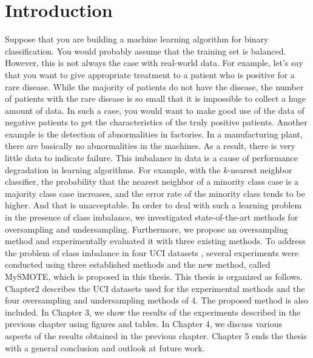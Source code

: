 \chapter{Introduction}

Suppose that you are building a machine learning algorithm for binary classification.
You would probably assume that the training set is balanced. However, this is not always the case with real-world data. For example, let's say that you want to give appropriate treatment to a patient who is positive for a rare disease. While the majority of patients do not have the disease, the number of patients with the rare disease is so small that it is impossible to collect a huge amount of data. In such a case, you would want to make good use of the data of negative patients to get the characteristics of the truly positive patients. 
Another example is the detection of abnormalities in factories. In a manufacturing plant, there are basically no abnormalities in the machines. As a result, there is very little data to indicate failure. This imbalance in data is a cause of performance degradation in learning algorithms. For example, with the $k$-nearest neighbor classifier, the probability that the nearest neighbor of a minority class case is a majority class case increases, and the error rate of the minority class tends to be higher. And that is unacceptable. In order to deal with such a learning problem in the presence of class imbalance, we investigated state-of-the-art methods for oversampling and undersampling. 
Furthermore, we propose an oversampling method and experimentally evaluated it with three existing methods.
To address the problem of class imbalance in four UCI datasets \cite{UCI}, several experiments were conducted using three established methods and the new method, called MySMOTE, which is proposed in this thesis.
This thesis is organized as follows. Chapter2 describes the UCI datasets \cite{UCI} used for the experimental methods and the four oversampling and undersampling methods of 4. The proposed method is also included. In Chapter 3, we show the results of the experiments described in the previous chapter using figures and tables. In Chapter 4, we discuss various aspects of the results obtained in the previous chapter. Chapter 5 ends the thesis with a general conclusion and outlook at future work.